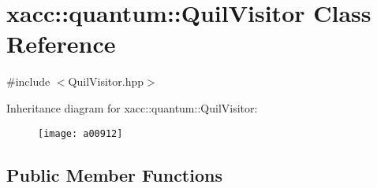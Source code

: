 \hypertarget{a00912}{}\section{xacc\+:\+:quantum\+:\+:Quil\+Visitor Class Reference}
\label{a00912}


{\ttfamily \#include $<$Quil\+Visitor.\+hpp$>$}

Inheritance diagram for xacc\+:\+:quantum\+:\+:Quil\+Visitor\+:\begin{figure}[H]
\begin{center}
\leavevmode
\texttt{[image: a00912]}
\end{center}
\end{figure}
\subsection*{Public Member Functions}
